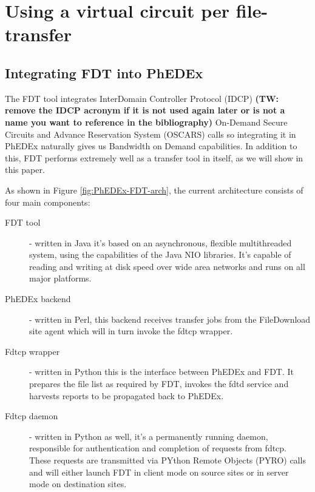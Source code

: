 \section{Using a virtual circuit per file-transfer}

\subsection{Integrating FDT into PhEDEx}
The FDT tool integrates InterDomain Controller Protocol (IDCP) \textbf{(TW: remove the IDCP acronym if it is not used again later or is not a name you want to reference in the bibliography)}
On-Demand Secure Circuits and Advance Reservation System (OSCARS\cite{OSCARS}) calls so
integrating it in PhEDEx naturally gives us Bandwidth on Demand
capabilities. In addition to this, FDT performs extremely well
as a transfer tool in itself, as we will show in this paper.

As shown in Figure \ref{fig:PhEDEx-FDT-arch}, the current architecture consists
of four main components:
\begin{description}
	\item[FDT tool] - written in Java it's based on an asynchronous, flexible 
multithreaded system, using the capabilities of the Java NIO 
libraries. It's capable of reading and writing at disk speed over wide area 
networks and runs on all major platforms. 
	\item[PhEDEx backend] - written in Perl, this backend
receives transfer jobs from the FileDownload site agent which will in turn 
invoke the fdtcp wrapper. 
	\item[Fdtcp wrapper] - written in Python this is the
interface between PhEDEx and FDT. It prepares the file list as required by FDT, 
invokes the fdtd service and harvests reports to be propagated back to PhEDEx.
	\item[Fdtcp daemon] - written in Python as well, it's
a permanently running daemon, responsible for authentication and completion of requests
from fdtcp. These requests are transmitted via PYthon Remote Objects (PYRO)
calls and will either launch FDT in client mode on source sites or in server
mode on destination sites.
\end{description}

